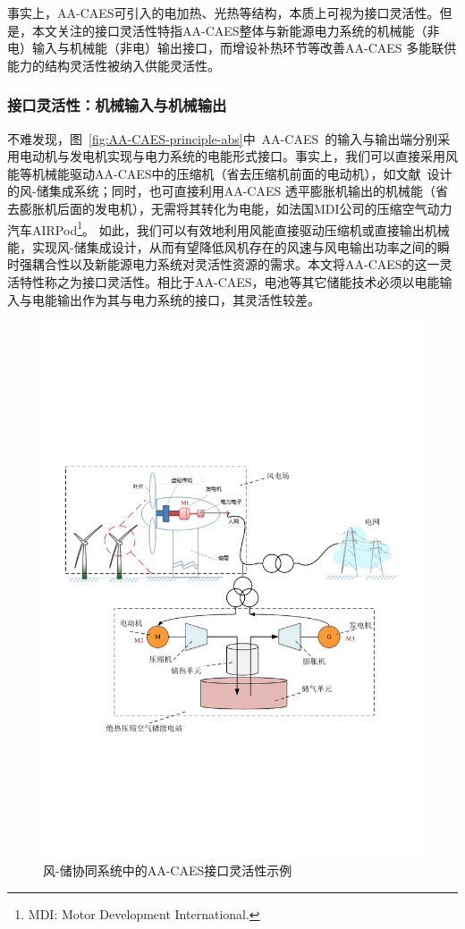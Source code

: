事实上，AA-CAES可引入的电加热、光热等结构，本质上可视为接口灵活性。但是，本文关注的接口灵活性特指AA-CAES整体与新能源电力系统的机械能（非电）输入与机械能（非电）输出接口，而增设补热环节等改善AA-CAES 多能联供能力的结构灵活性被纳入供能灵活性。

\subsubsection{接口灵活性：机械输入与机械输出}
不难发现，图~\ref{fig:AA-CAES-principle-abs}中~AA-CAES~的输入与输出端分别采用电动机与发电机实现与电力系统的电能形式接口。事实上，我们可以直接采用风能等机械能驱动AA-CAES中的压缩机（省去压缩机前面的电动机），如文献~设计的风-储集成系统；同时，也可直接利用AA-CAES 透平膨胀机输出的机械能（省去膨胀机后面的发电机），无需将其转化为电能，如法国MDI公司的压缩空气动力汽车AIRPod\footnote{MDI: Motor Development International.}。 如此，我们可以有效地利用风能直接驱动压缩机或直接输出机械能，实现风-储集成设计，从而有望降低风机存在的风速与风电输出功率之间的瞬时强耦合性以及新能源电力系统对灵活性资源的需求。本文将AA-CAES的这一灵活特性称之为接口灵活性。相比于AA-CAES，电池等其它储能技术必须以电能输入与电能输出作为其与电力系统的接口，其灵活性较差。

\begin{figure}[htp] %
  \centering
  \includegraphics[scale=0.75]{figures/Chap1-5-AA-CAES-Stru-Flex.pdf}
  \caption{风-储协同系统中的AA-CAES接口灵活性示例}
  \label{fig:AA-CAES-Stru-Felixibity}
\end{figure}

